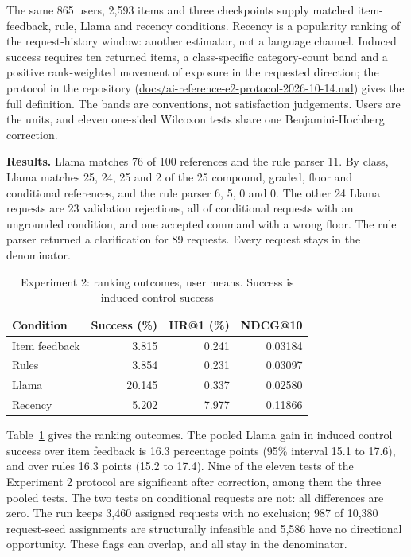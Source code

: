 \documentclass[conference]{IEEEtran}
\begin{document}
The same 865 users, 2,593 items and three checkpoints supply matched item-feedback, rule, Llama and recency conditions. Recency is a popularity ranking of the request-history window: another estimator, not a language channel. Induced success requires ten returned items, a class-specific category-count band and a positive rank-weighted movement of exposure in the requested direction; the protocol in the repository (\url{docs/ai-reference-e2-protocol-2026-10-14.md}) gives the full definition. The bands are conventions, not satisfaction judgements. Users are the units, and eleven one-sided Wilcoxon tests share one Benjamini-Hochberg correction.

\textbf{Results.} Llama matches 76 of 100 references and the rule parser 11. By class, Llama matches 25, 24, 25 and 2 of the 25 compound, graded, floor and conditional references, and the rule parser 6, 5, 0 and 0. The other 24 Llama requests are 23 validation rejections, all of conditional requests with an ungrounded condition, and one accepted command with a wrong floor. The rule parser returned a clarification for 89 requests. Every request stays in the denominator.

\begin{table}[t]\centering\footnotesize
\caption{Experiment 2: ranking outcomes, user means. Success is induced control success}\label{tab:airank}
\begin{tabular}{lrrr}\toprule
Condition & Success (\%) & HR@1 (\%) & NDCG@10\\\midrule
Item feedback & 3.815 & 0.241 & 0.03184\\
Rules & 3.854 & 0.231 & 0.03097\\
Llama & 20.145 & 0.337 & 0.02580\\
Recency & 5.202 & 7.977 & 0.11866\\
\bottomrule
\end{tabular}\end{table}

Table~\ref{tab:airank} gives the ranking outcomes. The pooled Llama gain in induced control success over item feedback is 16.3 percentage points (95\% interval 15.1 to 17.6), and over rules 16.3 points (15.2 to 17.4). Nine of the eleven tests of the Experiment 2 protocol are significant after correction, among them the three pooled tests. The two tests on conditional requests are not: all differences are zero. The run keeps 3,460 assigned requests with no exclusion; 987 of 10,380 request-seed assignments are structurally infeasible and 5,586 have no directional opportunity. These flags can overlap, and all stay in the denominator.
\end{document}
